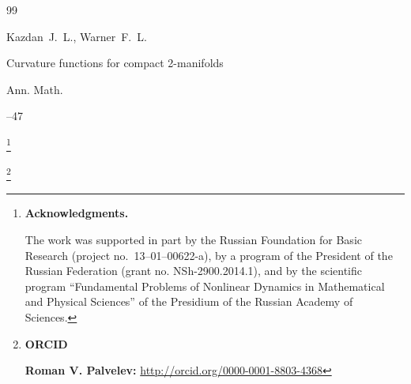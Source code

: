 \begin{thebibliography}{99}

\by Kazdan~J.~L., Warner~F.~L. 

\paper Curvature functions for compact 2-manifolds 

\jour Ann. Math. 




--47










\end{thebibliography}



\RuDate



\newpage



\makeentitle



\thanks{\textbf{Acknowledgments.} 

The work was supported in part by the Russian Foundation for Basic Research (project no.~13--01--00622-a), by a program of the President of the Russian Federation (grant no. NSh-2900.2014.1), and by the scientific program ``Fundamental Problems of Nonlinear Dynamics in Mathematical and Physical Sciences'' of the Presidium of the Russian Academy of Sciences.

}









\thanks{{\bf ORCID}



{\bf Roman V. Palvelev:} \url{http://orcid.org/0000-0001-8803-4368}



}





\EngRef





